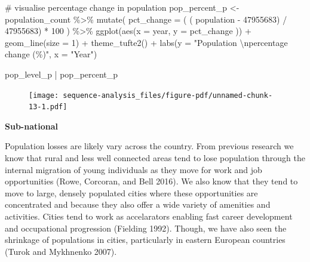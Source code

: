 \documentclass[
  letterpaper,
  DIV=11,
  numbers=noendperiod]{scrreprt}
\newenvironment{Shaded}{\begin{snugshade}}{\end{snugshade}}
\newcommand{\AttributeTok}[1]{\textcolor[rgb]{0.40,0.45,0.13}{#1}}
\newcommand{\CommentTok}[1]{\textcolor[rgb]{0.37,0.37,0.37}{#1}}
\newcommand{\DecValTok}[1]{\textcolor[rgb]{0.68,0.00,0.00}{#1}}
\newcommand{\FunctionTok}[1]{\textcolor[rgb]{0.28,0.35,0.67}{#1}}
\newcommand{\NormalTok}[1]{\textcolor[rgb]{0.00,0.23,0.31}{#1}}
\newcommand{\OtherTok}[1]{\textcolor[rgb]{0.00,0.23,0.31}{#1}}
\newcommand{\SpecialCharTok}[1]{\textcolor[rgb]{0.37,0.37,0.37}{#1}}
\newcommand{\StringTok}[1]{\textcolor[rgb]{0.13,0.47,0.30}{#1}}
\begin{document}
\begin{Shaded}
\begin{Highlighting}[]
\CommentTok{\# visualise percentage change in population}
\NormalTok{pop\_percent\_p }\OtherTok{\textless{}{-}}\NormalTok{ population\_count }\SpecialCharTok{\%\textgreater{}\%} 
  \FunctionTok{mutate}\NormalTok{(}
    \AttributeTok{pct\_change =}\NormalTok{ ( ( population }\SpecialCharTok{{-}} \DecValTok{47955683}\NormalTok{) }\SpecialCharTok{/} \DecValTok{47955683}\NormalTok{) }\SpecialCharTok{*} \DecValTok{100}
\NormalTok{  ) }\SpecialCharTok{\%\textgreater{}\%} 
\FunctionTok{ggplot}\NormalTok{(}\FunctionTok{aes}\NormalTok{(}\AttributeTok{x =}\NormalTok{ year, }\AttributeTok{y =}\NormalTok{ pct\_change )) }\SpecialCharTok{+}
  \FunctionTok{geom\_line}\NormalTok{(}\AttributeTok{size =} \DecValTok{1}\NormalTok{) }\SpecialCharTok{+}
  \FunctionTok{theme\_tufte2}\NormalTok{() }\SpecialCharTok{+} 
  \FunctionTok{labs}\NormalTok{(}\AttributeTok{y =} \StringTok{"Population }\SpecialCharTok{\textbackslash{}n}\StringTok{percentage change (\%)"}\NormalTok{,}
       \AttributeTok{x =} \StringTok{"Year"}\NormalTok{) }

\NormalTok{pop\_level\_p }\SpecialCharTok{|}\NormalTok{ pop\_percent\_p}
\end{Highlighting}
\end{Shaded}

\begin{figure}[H]

{\centering \texttt{[image: sequence-analysis\_files/figure-pdf/unnamed-chunk-13-1.pdf]}

}

\end{figure}

\textbf{Sub-national}

Population losses are likely vary across the country. From previous
research we know that rural and less well connected areas tend to lose
population through the internal migration of young individuals as they
move for work and job opportunities (Rowe, Corcoran, and Bell 2016). We
also know that they tend to move to large, densely populated cities
where these opportunities are concentrated and because they also offer a
wide variety of amenities and activities. Cities tend to work as
accelarators enabling fast career development and occupational
progression (Fielding 1992). Though, we have also seen the shrinkage of
populations in cities, particularly in eastern European countries (Turok
and Mykhnenko 2007).
\end{document}
